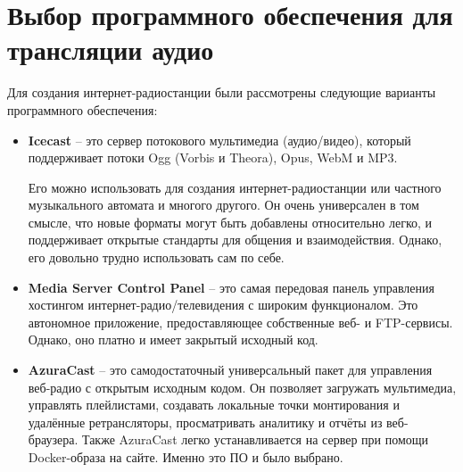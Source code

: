 \section{Выбор программного обеспечения для трансляции аудио}

Для создания интернет-радиостанции были рассмотрены следующие варианты программного обеспечения:

\begin{itemize}
      \item \textbf{Icecast}
            -- это сервер потокового мультимедиа (аудио/видео),  который поддерживает потоки Ogg (Vorbis и Theora), Opus, WebM и MP3.

            Его можно использовать для создания интернет-радиостанции или частного музыкального автомата и многого другого. Он очень универсален в том смысле, что новые форматы могут быть добавлены относительно легко, и поддерживает открытые стандарты для общения и взаимодействия. Однако, его довольно трудно использовать сам по себе.
      \item \textbf{Media Server Control Panel}
            -- это самая передовая панель управления хостингом интернет-радио/телевидения с широким функционалом. Это автономное приложение, предоставляющее собственные веб- и FTP-сервисы. Однако, оно платно и имеет закрытый исходный код.
      \item \textbf{AzuraCast}
            -- это самодостаточный универсальный пакет для управления веб-радио с открытым исходным кодом. Он позволяет загружать мультимедиа, управлять плейлистами, создавать локальные точки монтирования и удалённые ретрансляторы, просматривать аналитику и отчёты из веб-браузера. Также AzuraCast легко устанавливается на сервер при помощи Docker-образа на сайте. Именно это ПО и было выбрано.
\end{itemize}
